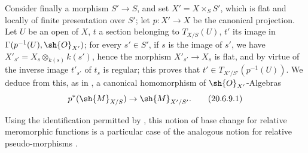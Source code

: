 \begin{env}[20.6.9]
\label{IV.20.6.9}
Consider finally a morphism $S'\to S$, and set $X'=X\times_S S'$, which is flat and locally of finite presentation over $S'$;
let $p:X'\to X$ be the canonical projection.
Let $U$ be an open of $X$, $t$ a section belonging to $T_{X/S}(U)$, $t'$ its image in $\Gamma(p^{-1}(U),\sh{O}_{X'})$;
for every $s'\in S'$, if $s$ is the image of $s'$, we have $X'_{s'}=X_s\otimes_{k(s)}k(s')$, hence the morphism $X'_{s'}\to X_s$ is flat, and by virtue of  the inverse image $t'_{s'}$ of $t_s$ is regular;
this proves that $t'\in T_{X'/S'}(p^{-1}(U))$.
We deduce from this, as in , a canonical homomorphism of $\sh{O}_{X'}$-Algebras
\[
\label{IV.20.6.9.1}
  p^*(\sh{M}_{X/S})\to\sh{M}_{X'/S'}.
  \tag{20.6.9.1}
\]

Using the identification permitted by , this notion of base change for relative meromorphic functions is a particular case of the analogous notion for relative pseudo-morphisms .
\end{env}

